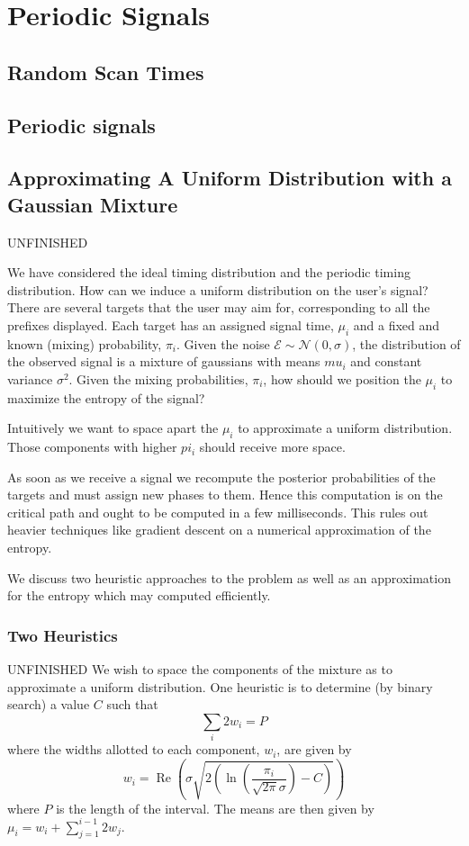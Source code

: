 \section{Periodic Signals}
\subsection{Random Scan Times}
\subsection{Periodic signals}
\subsection{Approximating A Uniform Distribution with a Gaussian Mixture}
UNFINISHED

We have considered the ideal timing distribution and the periodic timing distribution. 
How can we induce a uniform distribution on the user's signal?
There are several targets that the user may aim for, corresponding to all
the prefixes displayed.
Each target has an assigned signal time, $\mu_i$ and a fixed and known (mixing) probability, $\pi_i$. Given the noise $\mathcal{E} \sim \mathcal{N}(0, \sigma)$,
the distribution of the observed signal is a mixture of gaussians with means $mu_i$ and
constant variance $\sigma^2$.
Given the mixing probabilities, $\pi_i$, how should we position the $\mu_i$ to maximize the entropy of the signal?

Intuitively we want to space apart the $\mu_i$ to approximate a uniform distribution.
Those components with higher $pi_i$ should receive more space.

As soon as we receive a signal we recompute the posterior probabilities of the targets
and must assign new phases to them. Hence this computation is on the critical path
and ought to be computed in a few milliseconds. This rules out heavier techniques
like gradient descent on a numerical approximation of the entropy.

We discuss two heuristic approaches to the problem
as well as an approximation for the entropy which may computed efficiently.

\subsubsection{Two Heuristics}
UNFINISHED
We wish to space the components of the mixture as to approximate a uniform distribution.
One heuristic is to determine (by binary search) a value $C$ such that
$$\sum_i 2w_i = P$$
where the widths allotted to each component, $w_i$, are given by
$$w_i = \operatorname{Re}\left(\sigma \sqrt{2 \left( \ln \left( \frac{\pi_i}{\sqrt{2\pi}\sigma} \right) - C \right)}\right)$$
where $P$ is the length of the interval.
The means are then given by $\mu_i = w_i + \sum_{j=1}^{i-1} 2w_j$.

